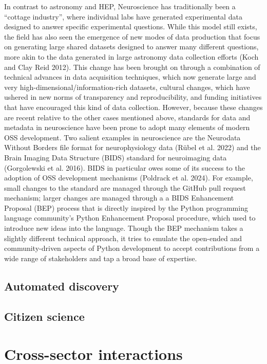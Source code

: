 \documentclass[
  letterpaper,
  DIV=11,
  numbers=noendperiod]{scrartcl}
\begin{document}
In contrast to astronomy and HEP, Neuroscience has traditionally been a
``cottage industry'', where individual labs have generated experimental
data designed to answer specific experimental questions. While this
model still exists, the field has also seen the emergence of new modes
of data production that focus on generating large shared datasets
designed to answer many different questions, more akin to the data
generated in large astronomy data collection efforts (Koch and Clay Reid
2012). This change has been brought on through a combination of
technical advances in data acquisition techniques, which now generate
large and very high-dimensional/information-rich datasets, cultural
changes, which have ushered in new norms of transparency and
reproducibility, and funding initiatives that have encouraged this kind
of data collection. However, because these changes are recent relative
to the other cases mentioned above, standards for data and metadata in
neuroscience have been prone to adopt many elements of modern OSS
development. Two salient examples in neuroscience are the Neurodata
Without Borders file format for neurophysiology data (Rübel et al. 2022)
and the Brain Imaging Data Structure (BIDS) standard for neuroimaging
data (Gorgolewski et al. 2016). BIDS in particular owes some of its
success to the adoption of OSS development mechanisms (Poldrack et al.
2024). For example, small changes to the standard are managed through
the GitHub pull request mechanism; larger changes are managed through a
a BIDS Enhancement Proposal (BEP) process that is directly inspired by
the Python programming language community's Python Enhancement Proposal
procedure, which used to introduce new ideas into the language. Though
the BEP mechanism takes a slightly different technical approach, it
tries to emulate the open-ended and community-driven aspects of Python
development to accept contributions from a wide range of stakeholders
and tap a broad base of expertise.

\subsection{Automated discovery}\label{automated-discovery}

\subsection{Citizen science}\label{citizen-science}

\section{Cross-sector interactions}\label{cross-sector-interactions}
\end{document}
